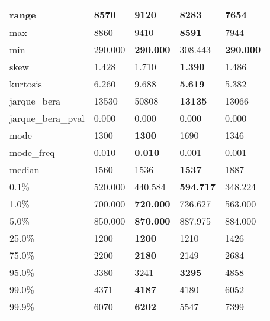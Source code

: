 \begin{table}[H]
\begin{tabular}{|l|m{10em}|m{10em}|m{10em}|m{10em}|}
\hline range & 8570 & 9120 & \bfseries 8283 & \cellcolor[rgb]{0.9, 0.54, 0.52} 7654 \\
\hline max & 8860 & 9410 & \bfseries 8591 & \cellcolor[rgb]{0.9, 0.54, 0.52} 7944 \\
\hline min & 290.000 & \bfseries 290.000 & \cellcolor[rgb]{0.9, 0.54, 0.52} 308.443 & \bfseries 290.000 \\
\hline skew & 1.428 & \cellcolor[rgb]{0.9, 0.54, 0.52} 1.710 & \bfseries 1.390 & 1.486 \\
\hline kurtosis & 6.260 & \cellcolor[rgb]{0.9, 0.54, 0.52} 9.688 & \bfseries 5.619 & 5.382 \\
\hline jarque\_bera & 13530 & \cellcolor[rgb]{0.9, 0.54, 0.52} 50808 & \bfseries 13135 & 13066 \\
\hline jarque\_bera\_pval & 0.000 & 0.000 & 0.000 & 0.000 \\
\hline mode & 1300 & \bfseries 1300 & \cellcolor[rgb]{0.9, 0.54, 0.52} 1690 & 1346 \\
\hline mode\_freq & 0.010 & \bfseries 0.010 & \cellcolor[rgb]{0.9, 0.54, 0.52} 0.001 & 0.001 \\
\hline median & 1560 & 1536 & \bfseries 1537 & \cellcolor[rgb]{0.9, 0.54, 0.52} 1887 \\
\hline 0.1\% & 520.000 & 440.584 & \bfseries 594.717 & \cellcolor[rgb]{0.9, 0.54, 0.52} 348.224 \\
\hline 1.0\% & 700.000 & \bfseries 720.000 & 736.627 & \cellcolor[rgb]{0.9, 0.54, 0.52} 563.000 \\
\hline 5.0\% & 850.000 & \bfseries 870.000 & \cellcolor[rgb]{0.9, 0.54, 0.52} 887.975 & 884.000 \\
\hline 25.0\% & 1200 & \bfseries 1200 & 1210 & \cellcolor[rgb]{0.9, 0.54, 0.52} 1426 \\
\hline 75.0\% & 2200 & \bfseries 2180 & 2149 & \cellcolor[rgb]{0.9, 0.54, 0.52} 2684 \\
\hline 95.0\% & 3380 & 3241 & \bfseries 3295 & \cellcolor[rgb]{0.9, 0.54, 0.52} 4858 \\
\hline 99.0\% & 4371 & \bfseries 4187 & 4180 & \cellcolor[rgb]{0.9, 0.54, 0.52} 6052 \\
\hline 99.9\% & 6070 & \bfseries 6202 & 5547 & \cellcolor[rgb]{0.9, 0.54, 0.52} 7399 \\
\hline
\end{tabular}
\end{table}
